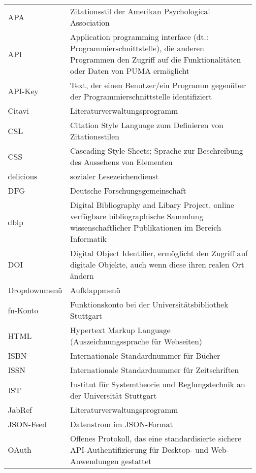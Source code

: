 \begin{longtable}{l p{8cm}}
APA&Zitationsstil der Amerikan Psychological Association\\ 
API&  Application programming interface (dt.: Programmierschnittstelle), die anderen Programmen den Zugriff auf die Funktionalitäten oder Daten von PUMA ermöglicht\\
API-Key&Text, der einen Benutzer/ein Programm gegenüber der Programmierschnittstelle identifiziert\\
Citavi & Literaturverwaltungsprogramm\\
CSL&Citation Style Language zum Definieren von Zitationsstilen\\
CSS&Cascading Style Sheets; Sprache zur Beschreibung des Aussehens von Elementen\\
delicious&sozialer Lesezeichendienst\\
DFG&Deutsche Forschungsgemeinschaft\\
dblp&Digital Bibliography and Libary Project, online verfügbare bibliographische Sammlung wissenschaftlicher Publikationen im Bereich Informatik\\
DOI&  Digital Object Identifier, ermöglicht den Zugriff auf digitale Objekte, auch wenn diese ihren realen Ort ändern\\
Dropdownmenü&Aufklappmenü\\
fn-Konto&Funktionskonto bei der Universitätsbibliothek Stuttgart\\
HTML  & Hypertext Markup Language (Auszeichnungssprache für Webseiten)\\
ISBN & Internationale Standardnummer für Bücher\\
ISSN & Internationale Standardnummer für Zeitschriften\\
IST &  Institut für Systemtheorie und Reglungstechnik an der Universität Stuttgart\\ 
JabRef & Literaturverwaltungsprogramm\\
JSON-Feed&Datenstrom im JSON-Format\\
OAuth & Offenes Protokoll, das eine standardisierte sichere API-Authentifizierung für Desktop- und Web- Anwendungen gestattet\\

\end{longtable}
